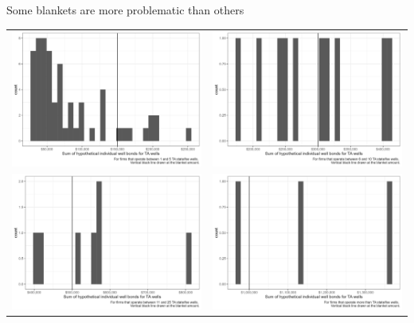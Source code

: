 \documentclass{beamer}
\begin{document}
\begin{frame}{Some blankets are more problematic than others}
\vspace{-1cm}
\begin{tabular}{cc}
    \includegraphics[width=0.45\linewidth]{Figures/Histogram_TA_1_5.jpg} & \includegraphics[width=0.45\linewidth]{Figures/Histogram_TA_6_10.jpg} \\
     \includegraphics[width=0.45\linewidth]{Figures/Histogram_TA_11_25.jpg}& \includegraphics[width=0.45\linewidth]{Figures/Histogram_TA_25.jpg}
\end{tabular}
\end{frame}
\end{document}
